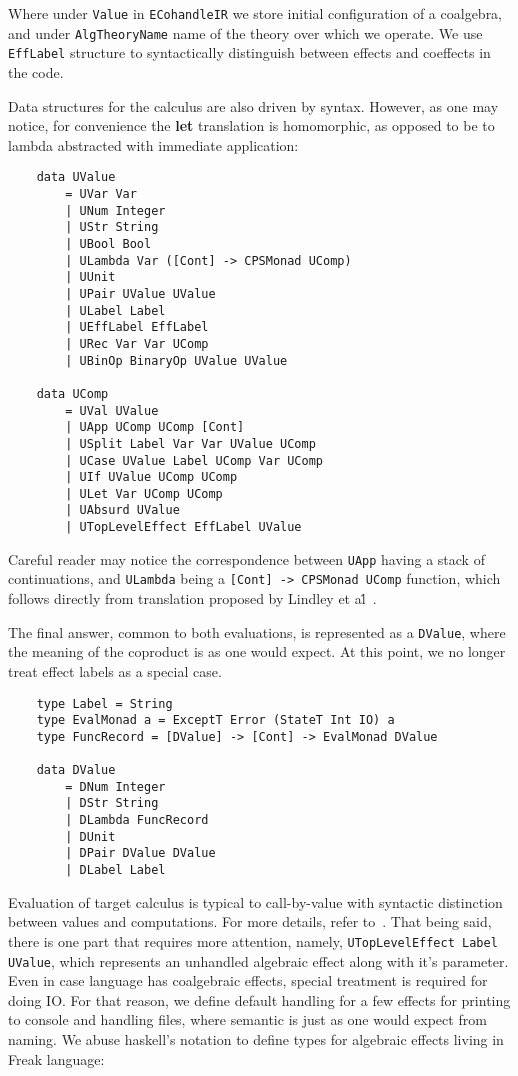 \documentclass[declaration,shortabstract]{iithesis}
\theoremstyle{definition} \newtheorem{definition}{Definition}[chapter]
\theoremstyle{remark} \newtheorem{remark}[definition]{Observation}
\theoremstyle{plain} \newtheorem{theorem}[definition]{Theorem}
\theoremstyle{plain} \newtheorem{lemma}[definition]{Lemma}
\begin{document}
    \noindent
    Where under \verb!Value! in \verb!ECohandleIR! we store initial
    configuration of a coalgebra, and under \verb!AlgTheoryName! name of the
    theory over which we operate. We use \verb!EffLabel! structure to
    syntactically distinguish between effects and coeffects in the code.

    Data structures for the calculus are also driven by syntax. However, as one
    may notice, for convenience the \textbf{let} translation is homomorphic,
    as opposed to be to lambda abstracted with immediate application:

\begin{verbatim}
    data UValue
        = UVar Var
        | UNum Integer
        | UStr String
        | UBool Bool
        | ULambda Var ([Cont] -> CPSMonad UComp)
        | UUnit
        | UPair UValue UValue
        | ULabel Label
        | UEffLabel EffLabel
        | URec Var Var UComp
        | UBinOp BinaryOp UValue UValue

    data UComp
        = UVal UValue
        | UApp UComp UComp [Cont]
        | USplit Label Var Var UValue UComp
        | UCase UValue Label UComp Var UComp
        | UIf UValue UComp UComp
        | ULet Var UComp UComp
        | UAbsurd UValue
        | UTopLevelEffect EffLabel UValue
\end{verbatim}

    \noindent
    Careful reader may notice the correspondence between \verb!UApp! having
    a stack of continuations, and \verb!ULambda! being a
    \verb![Cont] -> CPSMonad UComp! function, which follows directly from
    translation proposed by Lindley et al\.~\cite{handlers-cps-journal}.

    The final answer, common to both evaluations, is represented as a \verb!DValue!,
    where the meaning of the coproduct is as one would expect. At this point,
    we no longer treat effect labels as a special case.

\begin{verbatim}
    type Label = String
    type EvalMonad a = ExceptT Error (StateT Int IO) a
    type FuncRecord = [DValue] -> [Cont] -> EvalMonad DValue

    data DValue
        = DNum Integer
        | DStr String
        | DLambda FuncRecord
        | DUnit
        | DPair DValue DValue
        | DLabel Label
\end{verbatim}

    Evaluation of target calculus is typical to call-by-value with syntactic
    distinction between values and computations. For more details, refer
    to~\cite{handlers-cps-journal}. That being said, there is one part
    that requires more attention, namely, \verb!UTopLevelEffect Label UValue!,
    which represents an unhandled algebraic effect along with it's parameter.
    Even in case language has coalgebraic effects, special treatment is required
    for doing IO\@. For that reason, we define default handling for a few effects
    for printing to console and handling files, where semantic is just as one
    would expect from naming. We abuse haskell's notation to define types for
    algebraic effects living in Freak language:
\end{document}
